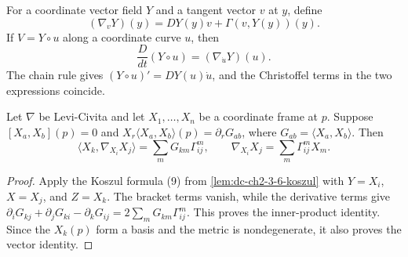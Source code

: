 \begin{lemma}
  \label{lem:dc-ch2-2-2-c-coord}
  \leanok
  For a coordinate vector field $Y$ and a tangent vector $v$ at $y$, define
  \[
    (\nabla_vY)(y)=DY(y)v+\Gamma(v,Y(y))(y).
  \]
  If $V=Y\circ u$ along a coordinate curve $u$, then
  \[
    \frac{D}{dt}(Y\circ u)=(\nabla_{\dot u}Y)(u).
  \]
  \sketch
  The chain rule gives $(Y\circ u)'=DY(u)\dot u$, and the Christoffel terms in
  the two expressions coincide.
\end{lemma}

\begin{lemma}
  \label{lem:dc-ch2-2-2-c-formula10}
  \leanok
  Let $\nabla$ be Levi-Civita and let $X_1,\dots,X_n$ be a coordinate frame at
  $p$. Suppose $[X_a,X_b](p)=0$ and
  $X_r\langle X_a,X_b\rangle(p)=\partial_rG_{ab}$, where
  $G_{ab}=\langle X_a,X_b\rangle$. Then
  \[
    \langle X_k,\nabla_{X_i}X_j\rangle
      =\sum_mG_{km}\Gamma^m_{ij},
    \qquad
    \nabla_{X_i}X_j=\sum_m\Gamma^m_{ij}X_m.\tag{10}
  \]
  \begin{proof}
    \leanok
    \sketch
    Apply the Koszul formula (9) from \cref{lem:dc-ch2-3-6-koszul} with
    $Y=X_i$, $X=X_j$, and $Z=X_k$. The bracket terms vanish, while the derivative
    terms give
    $\partial_iG_{kj}+\partial_jG_{ki}-\partial_kG_{ij}
      =2\sum_mG_{km}\Gamma^m_{ij}$.
    This proves the inner-product identity. Since the $X_k(p)$ form a basis and
    the metric is nondegenerate, it also proves the vector identity.
  \end{proof}
\end{lemma}

